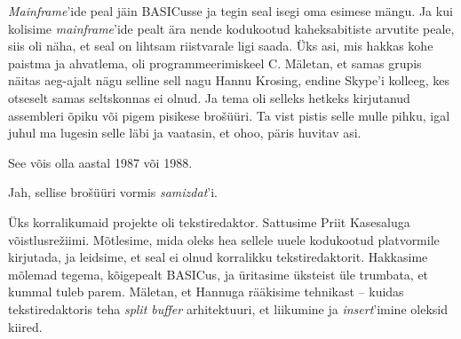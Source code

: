 
\emph{Mainframe}'ide peal jäin BASICusse ja tegin seal isegi 
oma esimese mängu. Ja kui kolisime \emph{mainframe}'ide pealt ära nende 
kodukootud kaheksabitiste arvutite peale, siis oli näha, et seal on lihtsam 
riistvarale ligi saada. Üks asi, mis hakkas kohe paistma ja ahvatlema, 
oli programmeerimiskeel C. Mäletan, et samas grupis näitas aeg-ajalt 
nägu selline sell nagu Hannu Krosing, 
endine Skype'i kolleeg, kes otseselt samas seltskonnas ei olnud. Ja tema oli 
selleks hetkeks kirjutanud assembleri õpiku või pigem pisikese 
brošüüri. Ta vist pistis selle mulle pihku,
igal juhul ma lugesin selle läbi ja vaatasin, et ohoo, päris 
huvitav asi. 


See võis olla aastal 1987 või 1988.


Jah, sellise brošüüri vormis 
\emph{samizdat}'i. 


Üks korralikumaid projekte oli tekstiredaktor\label{sisu!jaani_tekstiredaktor}. 
Sattusime Priit Kasesaluga 
võistlusrežiimi. Mõtlesime, mida oleks hea sellele uuele kodukootud 
platvormile kirjutada, ja leidsime, et seal ei olnud korralikku tekstiredaktorit. 
Hakkasime mõlemad tegema, kõigepealt BASICus, ja üritasime 
üksteist üle trumbata, et kummal tuleb parem. Mäletan, et 
Hannuga rääkisime tehnikast -- kuidas 
tekstiredaktoris teha \emph{split buffer} arhitektuuri, et 
liikumine ja \emph{insert}'imine oleksid kiired.

